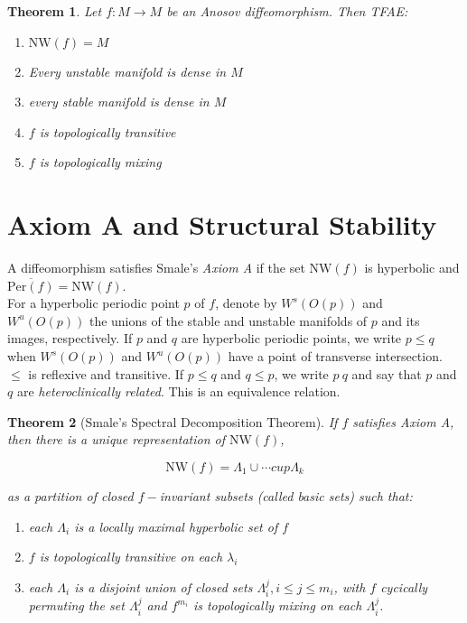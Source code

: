 \documentclass{article}
\newtheorem{thm}{Theorem}
\begin{document}
\begin{thm}

Let $f: M \to M$ be an Anosov diffeomorphism. Then TFAE:

\begin{enumerate}
    \item $\mathrm{NW}(f) = M$
    \item Every unstable manifold is dense in $M$
    \item every stable manifold is dense in $M$
    \item $f$ is topologically transitive
    \item $f$ is topologically mixing
\end{enumerate}
\end{thm}


\section{Axiom A and Structural Stability}

A diffeomorphism satisfies Smale's \textit{Axiom A} if the set $\mathrm{NW}(f)$ is hyperbolic and $\overline{\mathrm{Per}(f)} = \mathrm{NW}(f)$. \\
\indent For a hyperbolic periodic point $p$ of $f$, denote by $W^s(O(p))$ and $W^u(O(p))$ the unions of the stable and unstable manifolds of $p$ and its images, respectively. If $p$ and $q$ are hyperbolic periodic points, we write $p \leq q$ when $W^s(O(p))$ and $W^u(O(p))$ have a point of transverse intersection. $\leq$ is reflexive and transitive. If $p \leq q$ and $q \leq p$, we write $p ~ q$ and say that $p$ and $q$ are \textit{heteroclinically related}. This is an equivalence relation. \\

\begin{thm}[Smale's Spectral Decomposition Theorem]

If $f$ satisfies Axiom A, then there is a unique representation of $\mathrm{NW}(f)$,

\[\mathrm{NW}(f) = \Lambda_1 \cup \cdots cup \Lambda_k\]

as a partition of closed $f-$invariant subsets (called basic sets) such that: 

\begin{enumerate}
    \item each $\Lambda_i$ is a locally maximal hyperbolic set of $f$
    \item $f$ is topologically transitive on each $\lambda_i$
    \item each $\Lambda_i$ is a disjoint union of closed sets $\Lambda^j_i, i \leq j \leq m_i$, with $f$ cycically permuting the set $\Lambda^j_i$ and $f^{m_i}$ is topologically mixing on each $\Lambda^j_i$.
\end{enumerate}
\end{thm}
\end{document}
